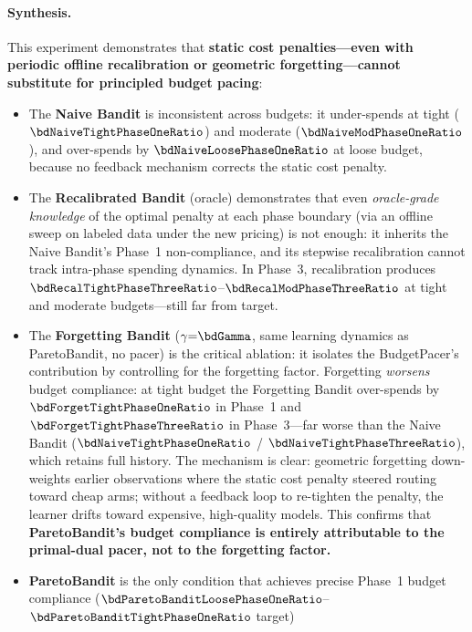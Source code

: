 \paragraph{Synthesis.}
This experiment demonstrates that
\textbf{static cost penalties---even with periodic offline
recalibration or geometric forgetting---cannot substitute for
principled budget pacing}:
\begin{itemize}[nosep,leftmargin=*]
  \item The \textbf{Naive Bandit} is inconsistent across budgets:
    it under-spends at tight ($\bdNaiveTightPhaseOneRatio$) and
    moderate ($\bdNaiveModPhaseOneRatio$), and over-spends by
    $\bdNaiveLoosePhaseOneRatio$ at loose budget, because no
    feedback mechanism corrects the static cost penalty.
  \item The \textbf{Recalibrated Bandit} (oracle) demonstrates that
    even \emph{oracle-grade knowledge} of the optimal penalty at each
    phase boundary (via an offline sweep on labeled data under the
    new pricing) is not enough: it inherits the Naive
    Bandit's Phase~1 non-compliance, and its stepwise recalibration
    cannot track intra-phase spending dynamics.
    In Phase~3, recalibration produces
    $\bdRecalTightPhaseThreeRatio$--$\bdRecalModPhaseThreeRatio$
    at tight and moderate budgets---still far from target.
  \item The \textbf{Forgetting Bandit} ($\gamma{=}\bdGamma$, same
    learning dynamics as ParetoBandit, no pacer) is the critical
    ablation: it isolates the BudgetPacer's contribution by
    controlling for the forgetting factor.
    Forgetting \emph{worsens} budget compliance: at tight budget
    the Forgetting Bandit over-spends by
    $\bdForgetTightPhaseOneRatio$ in Phase~1 and
    $\bdForgetTightPhaseThreeRatio$ in Phase~3---far worse than the
    Naive Bandit ($\bdNaiveTightPhaseOneRatio$ /
    $\bdNaiveTightPhaseThreeRatio$), which retains full history.
    The mechanism is clear: geometric forgetting down-weights
    earlier observations where the static cost penalty steered
    routing toward cheap arms; without a feedback loop to
    re-tighten the penalty, the learner drifts toward expensive,
    high-quality models.
    This confirms that \textbf{ParetoBandit's budget compliance
    is entirely attributable to the primal-dual pacer, not to
    the forgetting factor.}
  \item \textbf{ParetoBandit} is the only condition that achieves
    precise Phase~1 budget compliance
    ($\bdParetoBanditLoosePhaseOneRatio$--$\bdParetoBanditTightPhaseOneRatio$ target)

\end{itemize}

